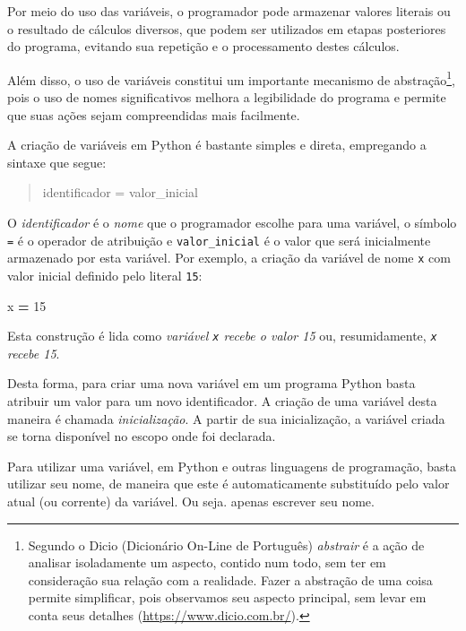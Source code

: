 \documentclass[
]{book}
\newenvironment{Shaded}{\begin{snugshade}}{\end{snugshade}}
\newcommand{\DecValTok}[1]{\textcolor[rgb]{0.00,0.00,0.81}{#1}}
\newcommand{\NormalTok}[1]{#1}
\newcommand{\OperatorTok}[1]{\textcolor[rgb]{0.81,0.36,0.00}{\textbf{#1}}}
\begin{document}
Por meio do uso das variáveis, o programador pode armazenar valores literais ou o resultado de cálculos diversos, que podem ser utilizados em etapas posteriores do programa, evitando sua repetição e o processamento destes cálculos.

Além disso, o uso de variáveis constitui um importante mecanismo de abstração\footnote{Segundo o Dicio (Dicionário On-Line de Português) \emph{abstrair} é a ação de analisar isoladamente um aspecto, contido num todo, sem ter em consideração sua relação com a realidade. Fazer a abstração de uma coisa permite simplificar, pois observamos seu aspecto principal, sem levar em conta seus detalhes (\url{https://www.dicio.com.br/}).}, pois o uso de nomes significativos melhora a legibilidade do programa e permite que suas ações sejam compreendidas mais facilmente.

A criação de variáveis em Python é bastante simples e direta, empregando a sintaxe que segue:

\begin{quote}
identificador = valor\_inicial
\end{quote}

O \emph{identificador} é o \emph{nome} que o programador escolhe para uma variável, o símbolo \texttt{=} é o operador de atribuição e \texttt{valor\_inicial} é o valor que será inicialmente armazenado por esta variável. Por exemplo, a criação da variável de nome \texttt{x} com valor inicial definido pelo literal \texttt{15}:

\begin{Shaded}
\begin{Highlighting}[]
\NormalTok{x }\OperatorTok{=} \DecValTok{15}
\end{Highlighting}
\end{Shaded}

Esta construção é lida como \emph{variável \texttt{x} recebe o valor 15} ou, resumidamente, \emph{\texttt{x} recebe 15}.

Desta forma, para criar uma nova variável em um programa Python basta atribuir um valor para um novo identificador. A criação de uma variável desta maneira é chamada \emph{inicialização}. A partir de sua inicialização, a variável criada se torna disponível no escopo onde foi declarada.

Para utilizar uma variável, em Python e outras linguagens de programação, basta utilizar seu nome, de maneira que este é automaticamente substituído pelo valor atual (ou corrente) da variável. Ou seja. apenas escrever seu nome.
\end{document}
